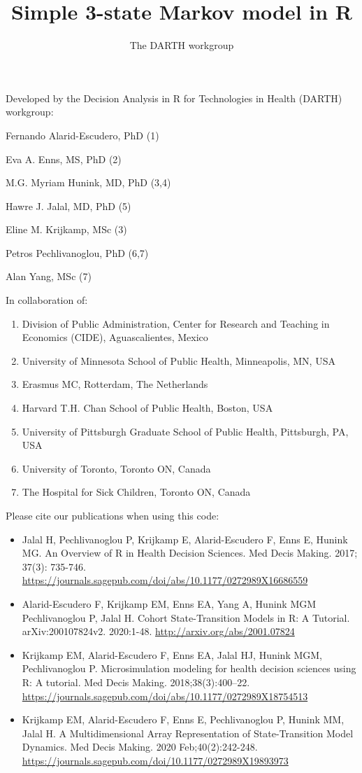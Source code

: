 \documentclass[
]{article}
\title{Simple 3-state Markov model in R}
\author{The DARTH workgroup}
\date{}
\providecommand{\tightlist}{%
  \setlength{\itemsep}{0pt}\setlength{\parskip}{0pt}}
\begin{document}
\maketitle

Developed by the Decision Analysis in R for Technologies in Health
(DARTH) workgroup:

Fernando Alarid-Escudero, PhD (1)

Eva A. Enns, MS, PhD (2)

M.G. Myriam Hunink, MD, PhD (3,4)

Hawre J. Jalal, MD, PhD (5)

Eline M. Krijkamp, MSc (3)

Petros Pechlivanoglou, PhD (6,7)

Alan Yang, MSc (7)

In collaboration of:

\begin{enumerate}
\def\labelenumi{\arabic{enumi}.}
\tightlist
\item
  Division of Public Administration, Center for Research and Teaching in
  Economics (CIDE), Aguascalientes, Mexico
\item
  University of Minnesota School of Public Health, Minneapolis, MN, USA
\item
  Erasmus MC, Rotterdam, The Netherlands
\item
  Harvard T.H. Chan School of Public Health, Boston, USA
\item
  University of Pittsburgh Graduate School of Public Health, Pittsburgh,
  PA, USA
\item
  University of Toronto, Toronto ON, Canada
\item
  The Hospital for Sick Children, Toronto ON, Canada
\end{enumerate}

Please cite our publications when using this code:

\begin{itemize}
\item
  Jalal H, Pechlivanoglou P, Krijkamp E, Alarid-Escudero F, Enns E,
  Hunink MG. An Overview of R in Health Decision Sciences. Med Decis
  Making. 2017; 37(3): 735-746.
  \url{https://journals.sagepub.com/doi/abs/10.1177/0272989X16686559}
\item
  Alarid-Escudero F, Krijkamp EM, Enns EA, Yang A, Hunink MGM
  Pechlivanoglou P, Jalal H. Cohort State-Transition Models in R: A
  Tutorial. arXiv:200107824v2. 2020:1-48.
  \url{http://arxiv.org/abs/2001.07824}
\item
  Krijkamp EM, Alarid-Escudero F, Enns EA, Jalal HJ, Hunink MGM,
  Pechlivanoglou P. Microsimulation modeling for health decision
  sciences using R: A tutorial. Med Decis Making. 2018;38(3):400--22.
  \url{https://journals.sagepub.com/doi/abs/10.1177/0272989X18754513}
\item
  Krijkamp EM, Alarid-Escudero F, Enns E, Pechlivanoglou P, Hunink MM,
  Jalal H. A Multidimensional Array Representation of State-Transition
  Model Dynamics. Med Decis Making. 2020 Feb;40(2):242-248.
  \url{https://journals.sagepub.com/doi/10.1177/0272989X19893973}
\end{itemize}
\end{document}
